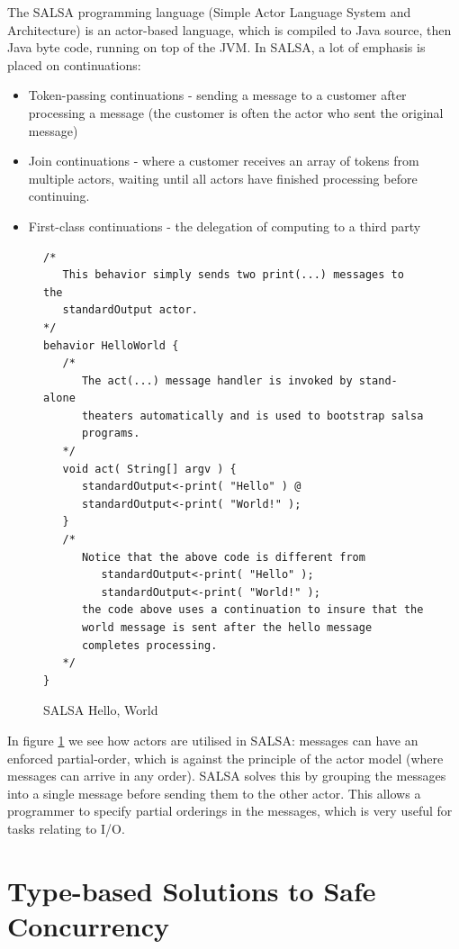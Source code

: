 \documentclass[pdftex,11pt,a4paper]{report}
\begin{document}
The SALSA programming language (Simple Actor Language System and Architecture) is an actor-based language, which is compiled to Java source, then Java byte code, running on top of the JVM.
In SALSA, a lot of emphasis is placed on continuations:
\begin{itemize}[noitemsep]
	\item Token-passing continuations - sending a message to a customer after processing a message (the customer is often the actor who sent the original message)
	\item Join continuations - where a customer receives an array of tokens from multiple actors, waiting until all actors have finished processing before continuing.
	\item First-class continuations - the delegation of computing to a third party\cite{salsa-continuations}
\end{itemize}

\begin{figure}[H]
\begin{verbatim}
/*
   This behavior simply sends two print(...) messages to the
   standardOutput actor.
*/
behavior HelloWorld {
   /*
      The act(...) message handler is invoked by stand-alone
      theaters automatically and is used to bootstrap salsa
      programs.
   */
   void act( String[] argv ) {
      standardOutput<-print( "Hello" ) @
      standardOutput<-print( "World!" );
   }
   /*
      Notice that the above code is different from
         standardOutput<-print( "Hello" );
         standardOutput<-print( "World!" );
      the code above uses a continuation to insure that the
      world message is sent after the hello message
      completes processing.
   */
}
\end{verbatim}
\caption{SALSA Hello, World\cite{salsa-example}}
\label{fig:salsa-helloworld}
\end{figure}

In figure \ref{fig:salsa-helloworld} we see how actors are utilised in SALSA: messages can have an enforced partial-order, which is against the principle of the actor model (where messages can arrive in any order).
SALSA solves this by grouping the messages into a single message before sending them to the other actor.
This allows a programmer to specify partial orderings in the messages, which is very useful for tasks relating to I/O.

\newpage
\section{Type-based Solutions to Safe Concurrency}
\end{document}
